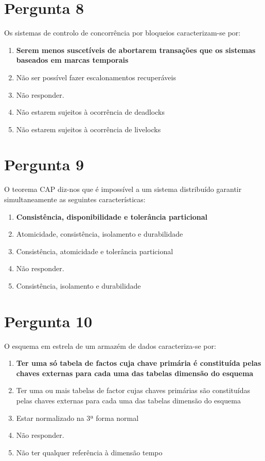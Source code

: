 \documentclass[type=normal, year=2014/15]{bdad_exam}
\begin{document}
{\section{Pergunta 8}
Os sistemas de controlo de concorrência por bloqueios caracterizam-se por:
\begin{enumerate}[label=\alph*.]\itemsep0em
    \item \textbf{Serem menos suscetíveis de abortarem transações que os sistemas baseados em marcas temporais \greencheckmark}
    \item Não ser possível fazer escalonamentos recuperáveis
    \item Não responder.
    \item Não estarem sujeitos à ocorrência de deadlocks
    \item Não estarem sujeitos à ocorrência de livelocks
\end{enumerate}

\section{Pergunta 9}
O teorema CAP diz-nos que é impossível a um sistema distribuído garantir simultaneamente as seguintes características:
\begin{enumerate}[label=\alph*.]\itemsep0em
    \item \textbf{Consistência, disponibilidade e tolerância particional \greencheckmark}
    \item Atomicidade, consistência, isolamento e durabilidade
    \item Consistência, atomicidade e tolerância particional
    \item Não responder.
    \item Consistência, isolamento e durabilidade
\end{enumerate}

\section{Pergunta 10}
O esquema em estrela de um armazém de dados caracteriza-se por:
\begin{enumerate}[label=\alph*.]\itemsep0em
    \item \textbf{Ter uma só tabela de factos cuja chave primária é constituída pelas chaves externas para cada uma das tabelas dimensão do esquema \greencheckmark}
    \item Ter uma ou mais tabelas de factor cujas chaves primárias são constituídas pelas chaves externas para cada uma das tabelas dimensão do esquema
    \item Estar normalizado na 3ª forma normal
    \item Não responder.
    \item Não ter qualquer referência à dimensão tempo
\end{enumerate}

}
\end{document}

